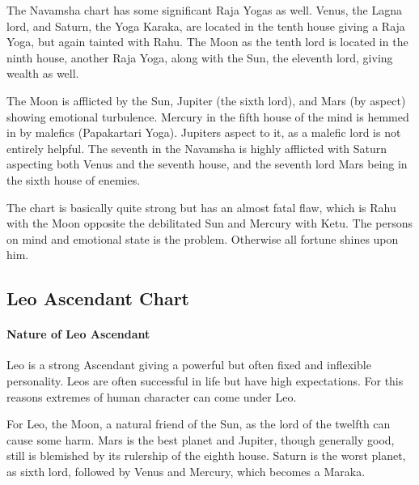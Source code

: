  

The Navamsha chart has some significant Raja Yogas as well. Venus, the Lagna lord, and Saturn, the Yoga Karaka, are located in the tenth house giving a Raja Yoga, but again tainted with Rahu. The Moon as the tenth lord is located in the ninth house, another Raja Yoga, along with the Sun, the eleventh lord, giving wealth as well.

 

The Moon is afflicted by the Sun, Jupiter (the sixth lord), and Mars (by aspect) showing emotional turbulence. Mercury in the fifth house of the mind is hemmed in by malefics (Papakartari Yoga). Jupiters aspect to it, as a malefic lord is not entirely helpful. The seventh in the Navamsha is highly afflicted with Saturn aspecting both Venus and the seventh house, and the seventh lord Mars being in the sixth house of enemies.

 

 

The chart is basically quite strong but has an almost fatal flaw, which is Rahu with the Moon opposite the debilitated Sun and Mercury with Ketu. The persons on mind and emotional state is the problem. Otherwise all fortune shines upon him.

 

\subsection{Leo Ascendant Chart}
 

\paragraph{Nature of Leo Ascendant}

 

Leo is a strong Ascendant giving a powerful but often fixed and inflexible personality. Leos are often successful in life but have high expectations. For this reasons extremes of human character can come under Leo.

 

For Leo, the Moon, a natural friend of the Sun, as the lord of the twelfth can cause some harm. Mars is the best planet and Jupiter, though generally good, still is blemished by its rulership of the eighth house. Saturn is the worst planet, as sixth lord, followed by Venus and Mercury, which becomes a Maraka.

 

